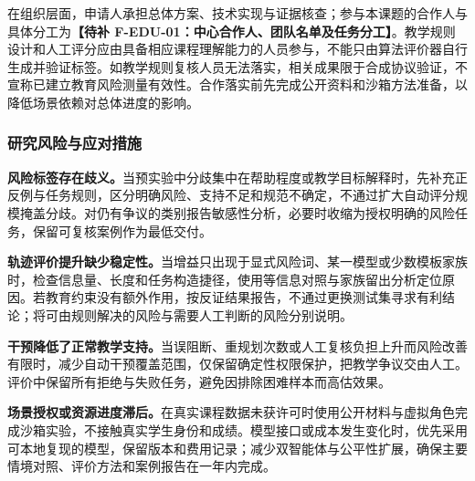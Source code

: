 在组织层面，申请人承担总体方案、技术实现与证据核查；参与本课题的合作人与具体分工为\textbf{【待补 F-EDU-01：中心合作人、团队名单及任务分工】}。教学规则设计和人工评分应由具备相应课程理解能力的人员参与，不能只由算法评价器自行生成并验证标签。如教学规则复核人员无法落实，相关成果限于合成协议验证，不宣称已建立教育风险测量有效性。合作落实前先完成公开资料和沙箱方法准备，以降低场景依赖对总体进度的影响。

\subsubsection{研究风险与应对措施}

\textbf{风险标签存在歧义。}当预实验中分歧集中在帮助程度或教学目标解释时，先补充正反例与任务规则，区分明确风险、支持不足和规范不确定，不通过扩大自动评分规模掩盖分歧。对仍有争议的类别报告敏感性分析，必要时收缩为授权明确的风险任务，保留可复核案例作为最低交付。

\textbf{轨迹评价提升缺少稳定性。}当增益只出现于显式风险词、某一模型或少数模板家族时，检查信息量、长度和任务构造捷径，使用等信息对照与家族留出分析定位原因。若教育约束没有额外作用，按反证结果报告，不通过更换测试集寻求有利结论；将可由规则解决的风险与需要人工判断的风险分别说明。

\textbf{干预降低了正常教学支持。}当误阻断、重规划次数或人工复核负担上升而风险改善有限时，减少自动干预覆盖范围，仅保留确定性权限保护，把教学争议交由人工。评价中保留所有拒绝与失败任务，避免因排除困难样本而高估效果。

\textbf{场景授权或资源进度滞后。}在真实课程数据未获许可时使用公开材料与虚拟角色完成沙箱实验，不接触真实学生身份和成绩。模型接口或成本发生变化时，优先采用可本地复现的模型，保留版本和费用记录；减少双智能体与公平性扩展，确保主要情境对照、评价方法和案例报告在一年内完成。

